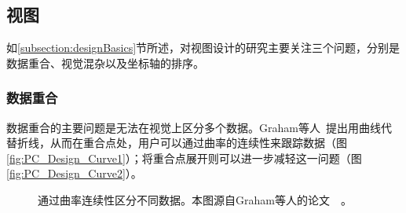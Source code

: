 \documentclass[12pt,twocolumn]{article}
\begin{document}
\subsection{视图}
\label{subsection:designImpro}

如\ref{subsection:designBasics}节所述，对视图设计的研究主要关注三个问题，分别是数据重合、视觉混杂以及坐标轴的排序。

\subsubsection{数据重合}

数据重合的主要问题是无法在视觉上区分多个数据。Graham等人~\citep{graham2003using}提出用曲线代替折线，从而在重合点处，用户可以通过曲率的连续性来跟踪数据（图\ref{fig:PC_Design_Curve1}）；将重合点展开则可以进一步减轻这一问题（图\ref{fig:PC_Design_Curve2}）。

\begin{figure}[!htb]
\centering
{}
\caption{通过曲率连续性区分不同数据。本图源自Graham等人的论文~\citep{graham2003using}~。}
\end{figure}
\end{document}
